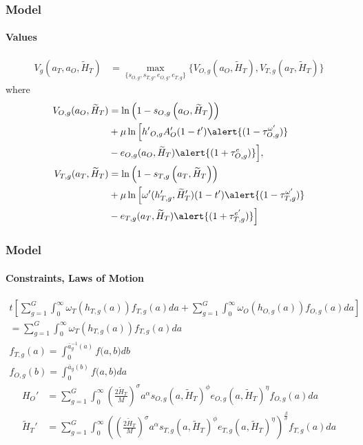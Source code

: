 \documentclass[11pt]{beamer}
\begin{document}
	
	\begin{frame}
		\frametitle{Model}
		\framesubtitle{Values}
		\begin{align*}
			\label{}
			V_g(a_T,a_O,\widetilde{H}_T) & = \max_{\{s_{O,g},s_{T,g},e_{O,g},e_{T,g}\}} \bigg\{ V_{O,g}(a_O,\widetilde{H}_T), V_{T,g}(a_T,\widetilde{H}_T) \bigg\} \label{eq:V}
		\end{align*}
		where
		\begin{align*}
			V_{O,g}(a_O,\widetilde{H}_T) & = \ln\left(1-s_{O,g}\left(a_O,\widetilde{H}_T\right)\right) \nonumber \\
			& + \mu \ln \Big[ {{h'}_{O,g}} A_O'(1-t')\alert{(1-\tau^{\omega '}_{O,g})} \nonumber \\
			& - e_{O,g}(a_O,\widetilde{H}_T)\alert{(1+\tau^e_{O,g})} \Big],\\
			V_{T,g}(a_T,\widetilde{H}_T) & = \ln\left(1-s_{T,g}\left(a_T,\widetilde{H}_T\right)\right) \nonumber \\
			& + \mu \ln \Big[ \omega'({h_{T,g}'},{\widetilde{H}_{T}'})(1-t')\alert{(1-\tau^{\omega '}_{T,g}) }\nonumber \\
			& - e_{T,g}(a_T,\widetilde{H}_T)\alert{(1+\tau^{e '}_{T,g})} \Big] 
		\end{align*}
	\end{frame}
	
	\begin{frame}
		\frametitle{Model}
		\framesubtitle{Constraints, Laws of Motion}
		\small
		\begin{align*}
			t\left[ \sum_{g=1}^G \int_0^\infty \omega_T\left(h_{T,g}(a)\right) f_{T,g}(a) da +  \sum_{g=1}^G \int_0^\infty \omega_O\left(h_{O,g}(a)\right) f_{O,g}(a) da \right]  \nonumber\\
			= \sum_{g=1}^G\int_0^\infty \omega_T\left(h_{T,g}(a)\right) f_{T,g}(a) da \\%
			f_{T,g}(a)  = \int_0^{\bar{a}_g^{-1}\left(a\right)} f\big(a,b \big) db \\
			f_{O,g}(b)  = \int_0^{\bar{a}_g\left(b\right)} f\big(a,b \big) da 
		\end{align*}
		\begin{align*}
			{H}_{O}' & = \sum_{g=1}^G \int_0^\infty \left(\tfrac{2 \widetilde{H}_T}{M}\right)^\sigma a^\alpha s_{O,g}\left(a,\widetilde{H}_T\right)^\phi e_{O,g}(a,\widetilde{H}_T)^\eta  f_{O,g}(a) da \\
			\widetilde{H}_{T}' & = \sum_{g=1}^G \int_0^\infty \left(\left(\tfrac{2 \widetilde{H}_T}{M}\right)^\sigma a^\alpha s_{T,g}\left(a,\widetilde{H}_T\right)^\phi e_{T,g}(a,\widetilde{H}_T)^\eta \right)^{\frac{\beta}{\sigma}} f_{T,g}(a) da 
		\end{align*}
	\end{frame}
	
\end{document}

